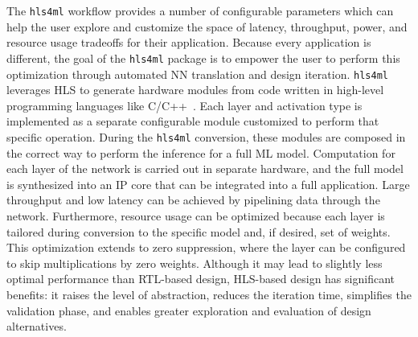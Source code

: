 \documentclass[tinyml]{acmart}
\newcommand{\hlsfml}{\texttt{hls4ml}\xspace}
\begin{document}

The \hlsfml workflow provides a number of configurable parameters which can help the user explore and customize the space of latency, throughput, power, and resource usage tradeoffs for their application.
Because every application is different, the goal of the \hlsfml package is to empower the user to perform this optimization through automated NN translation and design iteration.
\hlsfml leverages HLS to generate hardware modules from code written in high-level programming languages like \textsc{C}/\textsc{C++}~\cite{numan2020towards}.
Each layer and activation type is implemented as a separate configurable module customized to perform that specific operation.
During the \hlsfml conversion, these modules are composed in the correct way to perform the inference for a full ML model.
Computation for each layer of the network is carried out in separate hardware, and the full model is synthesized into an IP core that can be integrated into a full application.
Large throughput and low latency can be achieved by pipelining data through the network.
Furthermore, resource usage can be optimized because each layer is tailored during conversion to the specific model and, if desired, set of weights.
This optimization extends to zero suppression, where the layer can be configured to skip multiplications by zero weights.
Although it may lead to slightly less optimal performance than RTL-based design, HLS-based design has significant benefits: it raises the level of abstraction, reduces the iteration time, simplifies the validation phase, and enables greater exploration and evaluation of design alternatives.
\end{document}
